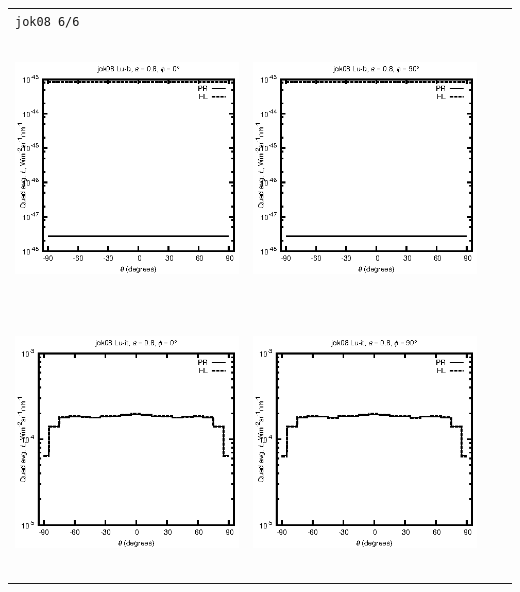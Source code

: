 \begin{tabular}{c c c c}
\multicolumn{4}{l}{\texttt{jok08 6/6}} \\
\includegraphics[height=7cm]{../eps/jok08_Lu_b_fwd.eps} &
\includegraphics[height=7cm]{../eps/jok08_Lu_b_cross.eps} \\
\includegraphics[height=7cm]{../eps/jok08_Lu_it_fwd.eps} &
\includegraphics[height=7cm]{../eps/jok08_Lu_it_cross.eps} \\

\end{tabular}
